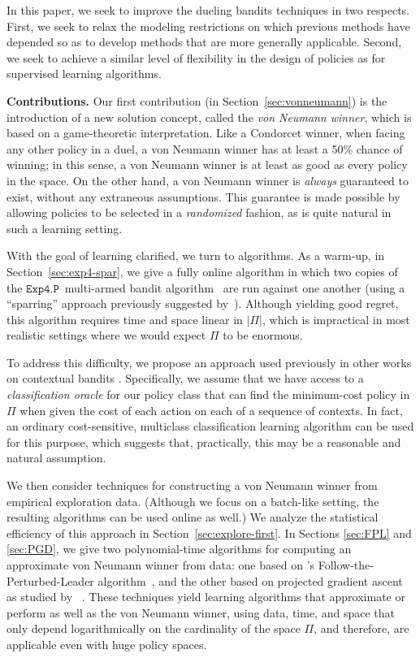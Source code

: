 In this paper, we seek to improve the dueling bandits techniques in two respects. First, we seek to relax the modeling restrictions on which previous methods have depended so as to develop methods that are more generally applicable. Second, we seek to achieve a similar level of flexibility in the design of policies as for supervised learning algorithms.

 {\bf Contributions.} Our first contribution (in Section~\ref{sec:vonneumann}) is the introduction of a new solution concept, called the \emph{von Neumann winner}, which is based on a game-theoretic interpretation. Like a Condorcet winner, when facing any other policy in a duel, a von Neumann winner has at least a 50\% chance of winning; in this sense, a von Neumann winner is at least as good as every policy in the space. On the other hand, a von Neumann winner is {\em always\/} guaranteed to exist, without any extraneous assumptions. This guarantee is made possible by allowing policies to be selected in a {\em randomized\/} fashion, as is quite natural in such a learning setting.

With the goal of learning clarified, we turn to algorithms. As a warm-up, in Section~\ref{sec:exp4-spar}, we give a fully online algorithm in which two copies of the \ensuremath{\mathtt{Exp4.P}}\ multi-armed bandit algorithm~\citep{beygelzimer11:epoch} are run against one another (using a ``sparring'' approach previously suggested by~\citealp{Ailon:2014}).
Although yielding good regret, this algorithm requires time and space linear in ${|\Pi|}$, which is impractical in most realistic settings where we would expect $\Pi$ to be enormous.

To address this difficulty, we propose an approach used previously in other works on contextual bandits \citep{LangfordZh07,dudik2011efficient,AgarwalEtAl14}. Specifically, we assume that we have access to a \emph{classification oracle} for our policy class that can find the minimum-cost policy in $\Pi$ when given the cost of each action on each of a sequence of contexts. In fact, an ordinary cost-sensitive, multiclass classification learning algorithm can be used for this purpose, which suggests that, practically, this may be a reasonable and natural assumption.

We then consider techniques for constructing a von Neumann winner from empirical exploration data. (Although we focus on a batch-like setting, the resulting algorithms can be used online as well.) We analyze the statistical efficiency of this approach in Section~\ref{sec:explore-first}.
In Sections \ref{sec:FPL} and \ref{sec:PGD}, we  give two polynomial-time algorithms for computing an approximate von Neumann winner from data: one based on
\citeauthor{kalai03:fpl}'s Follow-the-Perturbed-Leader algorithm~\citeyearpar{kalai03:fpl}, and the other based on projected gradient ascent as studied by ~\citet{Zinkevich03:online}.
These techniques yield learning algorithms that approximate or perform as well as the von Neumann winner, using data, time, and space that only depend logarithmically on the cardinality of the space $\Pi$, and therefore, are applicable even with huge policy spaces.

